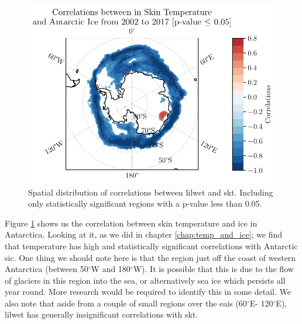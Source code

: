 \documentclass[../main.tex]{subfiles}
\begin{document}
\begin{figure}[hbt!]
    \centering
    \includegraphics{images/2021w5/chapter7/hres/correlation_spatial_skt}
    \caption{Spatial distribution of correlations between \gls{lilwet} and \gls{skt}. Including only statistically significant regions with a p-value less than 0.05.}
    \label{fig:correlation_spatial_skt}
\end{figure}
Figure \ref{fig:correlation_spatial_skt} shows us the correlation between skin temperature and ice in Antarctica. Looking at it, as we did in chapter \ref{chap:temp_and_ice}; we find that temperature has high and statistically significant correlations with Antarctic \gls{sic}. One thing we should note here is that the region just off the coast of western Antarctica (between 50$^\circ$W and 180$^\circ$W). It is possible that this is due to the flow of glaciers in this region into the sea, or alternatively sea ice which persists all year round. More research would be required to identify this in some detail. We also note that aside from a couple of small regions over the \gls{eais} (60$^\circ$E- 120$^\circ$E), \gls{lilwet} has generally insignificant correlations with \gls{skt}.
\end{document}
